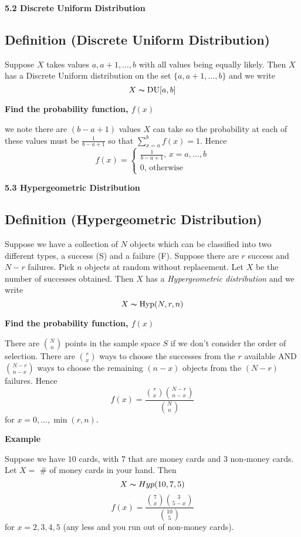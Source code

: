 \textbf{5.2 Discrete Uniform Distribution}
\begin{defbox}
    \subsection{Definition (Discrete Uniform Distribution)}
    Suppose $ X $ takes values $ a,a+1,\ldots ,b $ with all values
    being equally likely. Then $ X $ has a Discrete Uniform distribution
    on the set $ \{a,a+1,\ldots ,b\} $ and we write
    \[ X \thicksim \operatorname{DU}[a,b] \]
\end{defbox}

\textbf{Find the probability function, $ f(x)$}

we note there are $ (b-a+1) $ values $ X $ can take so the probability
at each of these values must be $ \frac{1}{b-a+1} $ so that
$ \sum\limits_{x=a}^{b} f(x)=1 $. Hence
\[ f(x)=
\begin{cases}
    \frac{1}{b-a+1},\,x=a,\ldots,b\\
    0,\,\text{otherwise}
\end{cases} \]

\textbf{5.3 Hypergeometric Distribution}
\begin{defbox}
    \subsection{Definition (Hypergeometric Distribution)}
    Suppose we have a collection of $ N $ objects which can be
    classified into two different types, a success (S) and a failure (F).
    Suppose there are $ r $ success and $ N-r $ failures. Pick $ n $
    objects at random without replacement. Let $ X $ be the number of successes
    obtained. Then $ X $ has a \emph{Hypergeometric distribution} and we write
    \[ X \thicksim \operatorname{Hyp}(N,r,n) \]
\end{defbox}

\textbf{Find the probability function, $ f(x)$}

There are $ \binom{N}{n} $ points in the sample space $ S $ if we don't
consider the order of selection. There are $ \binom{r}{x} $ ways to choose
the successes from the $ r $ available AND $ \binom{N-r}{n-x} $ ways to choose
the remaining $ (n-x) $ objects from the $ (N-r) $ failures. Hence
\[ f(x)=\frac{\binom{r}{x}\binom{N-r}{n-x}}{\binom{N}{n}} \]
for $ x=0,\ldots ,\min(r,n) $.

\textbf{Example}

Suppose we have $ 10 $ cards, with $ 7 $ that are money cards and $ 3 $
non-money cards. Let $ X= $ \# of money cards in your hand. Then
\[ X \thicksim Hyp(10,7,5) \]
\[ f(x)=\frac{\binom{7}{x}\binom{3}{5-x}}{\binom{10}{5}} \]
for $ x=2,3,4,5 $ (any less and you run out of non-money cards).

